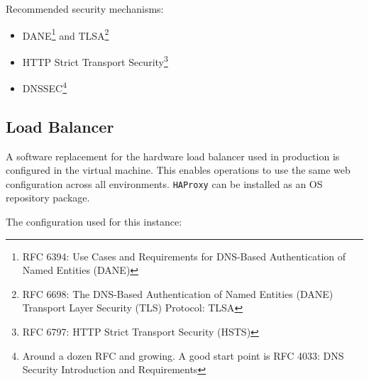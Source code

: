 \documentclass[11pt]{report}
\begin{document}
Recommended security mechanisms:

\begin{itemize}

    \item DANE\footnote{RFC 6394: Use Cases and Requirements for DNS-Based 
	Authentication of Named Entities (DANE)} and TLSA\footnote{RFC 6698: 
	The DNS-Based Authentication of Named Entities (DANE) Transport 
	Layer Security (TLS) Protocol: TLSA}

    \item HTTP Strict Transport Security\footnote{RFC 6797: HTTP Strict 
	Transport Security (HSTS)}

    \item DNSSEC\footnote{Around a dozen RFC and growing. A good start point 
	is RFC 4033: DNS Security Introduction and Requirements}

\end{itemize}


\subsection{Load Balancer}

A software replacement for the hardware load balancer used in production is
configured in the virtual machine.  This enables operations to use the same web
configuration across all environments.  \verb|HAProxy| can be installed as an
OS repository package.

The configuration used for this instance:
\end{document}
